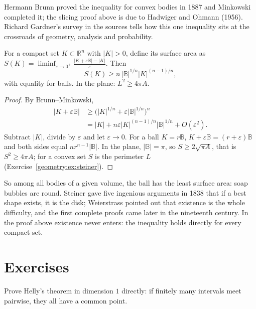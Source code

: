 Hermann Brunn proved the inequality for convex bodies in 1887 and Minkowski completed it; the slicing proof above is due to Hadwiger and Ohmann (1956).
Richard Gardner's survey in the sources tells how this one inequality sits at the crossroads of geometry, analysis and probability.

\begin{corollary}\label{geometry:cor:isoperimetric}
For a compact set $K\subset\mathbb R^n$ with $|K|>0$, define its surface area as $S(K)=\liminf_{\varepsilon\to0^+}\frac{|K+\varepsilon\mathbb B|-|K|}\varepsilon$. Then
\[
S(K)\ge n\,|\mathbb B|^{1/n}|K|^{(n-1)/n},
\]
with equality for balls. In the plane: $L^2\ge4\pi A$.
\end{corollary}

\begin{proof}
By Brunn--Minkowski,
\[
\begin{aligned}
|K+\varepsilon\mathbb B|&\ge\bigl(|K|^{1/n}+\varepsilon|\mathbb B|^{1/n}\bigr)^n\\
&=|K|+n\varepsilon|K|^{(n-1)/n}|\mathbb B|^{1/n}+O(\varepsilon^2).
\end{aligned}
\]
Subtract $|K|$, divide by $\varepsilon$ and let $\varepsilon\to0$. For a ball $K=r\mathbb B$, $K+\varepsilon\mathbb B=(r+\varepsilon)\mathbb B$ and both sides equal
$nr^{n-1}|\mathbb B|$. In the plane, $|\mathbb B|=\pi$, so $S\ge2\sqrt{\pi A}$, that is $S^2\ge4\pi A$; for a convex set $S$ is the perimeter $L$
(Exercise~\ref{geometry:ex:steiner}).
\end{proof}

So among all bodies of a given volume, the ball has the least surface area: soap bubbles are round. Steiner gave five ingenious arguments in 1838 that if a
best shape exists, it is the disk; Weierstrass pointed out that existence is the whole difficulty, and the first complete proofs came later in the
nineteenth century. In the proof above existence never enters: the inequality holds directly for every compact set.

\section{Exercises}

\begin{exercise}[$\star$]\label{geometry:ex:helly1d}
Prove Helly's theorem in dimension $1$ directly: if finitely many intervals meet pairwise, they all have a common point.
\end{exercise}

